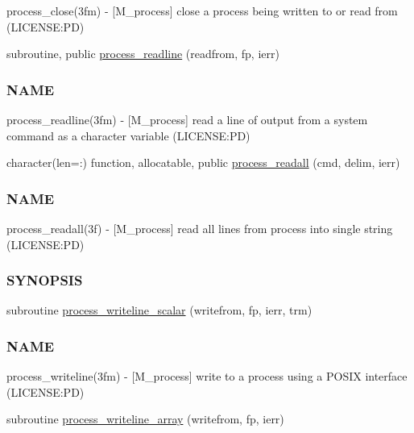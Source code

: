 \begin{DoxyCompactItemize}
\begin{DoxyCompactList}
process\+\_\+close(3fm) -\/ \mbox{[}M\+\_\+process\mbox{]} close a process being written to or read from (L\+I\+C\+E\+N\+SE\+:PD) \end{DoxyCompactList}\item 
subroutine, public \mbox{\hyperlink{namespacem__process_acbc72c5ed371430a471aa1f3010fbbda}{process\+\_\+readline}} (readfrom, fp, ierr)
\begin{DoxyCompactList}\small\item\em \subsubsection*{N\+A\+ME}

process\+\_\+readline(3fm) -\/ \mbox{[}M\+\_\+process\mbox{]} read a line of output from a system command as a character variable (L\+I\+C\+E\+N\+SE\+:PD) \end{DoxyCompactList}\item 
character(len=\+:) function, allocatable, public \mbox{\hyperlink{namespacem__process_a7dd759a1344789477ae1e205d7fa9a51}{process\+\_\+readall}} (cmd, delim, ierr)
\begin{DoxyCompactList}\small\item\em \subsubsection*{N\+A\+ME}

process\+\_\+readall(3f) -\/ \mbox{[}M\+\_\+process\mbox{]} read all lines from process into single string (L\+I\+C\+E\+N\+SE\+:PD) \subsubsection*{S\+Y\+N\+O\+P\+S\+IS}\end{DoxyCompactList}\item 
subroutine \mbox{\hyperlink{namespacem__process_a72527c0ec0af26dcb14b8bfad6dcd482}{process\+\_\+writeline\+\_\+scalar}} (writefrom, fp, ierr, trm)
\begin{DoxyCompactList}\small\item\em \subsubsection*{N\+A\+ME}

process\+\_\+writeline(3fm) -\/ \mbox{[}M\+\_\+process\mbox{]} write to a process using a P\+O\+S\+IX interface (L\+I\+C\+E\+N\+SE\+:PD) \end{DoxyCompactList}\item 
subroutine \mbox{\hyperlink{namespacem__process_a08887a918eba167ceacddf58ca084270}{process\+\_\+writeline\+\_\+array}} (writefrom, fp, ierr)
\end{DoxyCompactItemize}
